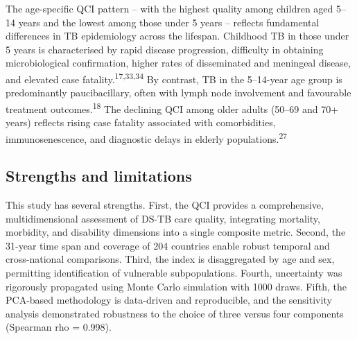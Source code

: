 \documentclass[12pt]{article}
\begin{document}
The age-specific QCI pattern -- with the highest quality among children aged 5--14 years and the lowest among those under 5 years -- reflects fundamental differences in TB epidemiology across the lifespan. Childhood TB in those under 5 years is characterised by rapid disease progression, difficulty in obtaining microbiological confirmation, higher rates of disseminated and meningeal disease, and elevated case fatality.\textsuperscript{17,33,34} By contrast, TB in the 5--14-year age group is predominantly paucibacillary, often with lymph node involvement and favourable treatment outcomes.\textsuperscript{18} The declining QCI among older adults (50--69 and 70+ years) reflects rising case fatality associated with comorbidities, immunosenescence, and diagnostic delays in elderly populations.\textsuperscript{27}

\subsection{Strengths and limitations}

This study has several strengths. First, the QCI provides a comprehensive, multidimensional assessment of DS-TB care quality, integrating mortality, morbidity, and disability dimensions into a single composite metric. Second, the 31-year time span and coverage of 204 countries enable robust temporal and cross-national comparisons. Third, the index is disaggregated by age and sex, permitting identification of vulnerable subpopulations. Fourth, uncertainty was rigorously propagated using Monte Carlo simulation with 1000 draws. Fifth, the PCA-based methodology is data-driven and reproducible, and the sensitivity analysis demonstrated robustness to the choice of three versus four components (Spearman rho = 0.998).
\end{document}

